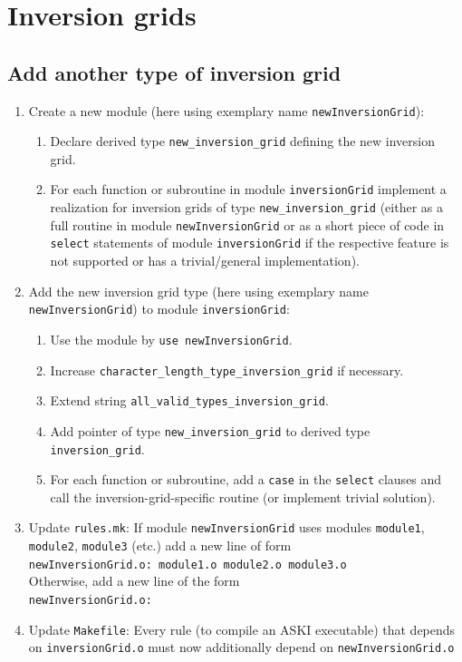 \documentclass[12pt,a4paper]{article}
\newcommand{\lcode}[1]{\nolinkurl{#1}}
\newcommand{\ASKI}{ {\ttfamily ASKI} }
\begin{document}
\section{Inversion grids} \label{sec:inversion_grid}
\subsection{Add another type of inversion grid} \label{ssec-invgrid:new-type}
\begin{enumerate}
\item Create a new module (here using exemplary name \lcode{newInversionGrid}):
  \begin{enumerate}
  \item Declare derived type \lcode{new_inversion_grid} defining the new inversion grid.
  \item For each function or subroutine in module \lcode{inversionGrid} implement a realization for
    inversion grids of type \lcode{new_inversion_grid} (either as a full routine in module \lcode{newInversionGrid}
    or as a short piece of code in \lcode{select} statements of module \lcode{inversionGrid} if the respective feature is not
    supported or has a trivial/general implementation).
  \end{enumerate}
\item Add the new inversion grid type (here using exemplary name \lcode{newInversionGrid}) to module
  \lcode{inversionGrid}:
  \begin{enumerate}
  \item Use the module by \lcode{use newInversionGrid}.
  \item Increase \lcode{character_length_type_inversion_grid} if necessary.
  \item Extend string \lcode{all_valid_types_inversion_grid}.
  \item Add pointer of type \lcode{new_inversion_grid} to derived type \lcode{inversion_grid}.
  \item For each function or subroutine, add a \lcode{case} in the \lcode{select} clauses and call the 
    inversion-grid-specific routine (or implement trivial solution).
  \end{enumerate}
\item Update \lcode{rules.mk}:
  If module \lcode{newInversionGrid} uses modules \lcode{module1}, \lcode{module2}, \lcode{module3} (etc.)
  add a new line of form \\
  \lcode{newInversionGrid.o: module1.o module2.o module3.o}\\
  Otherwise, add a new line of the form\\
  \lcode{newInversionGrid.o:}
\item Update \lcode{Makefile}: Every rule (to compile an \ASKI{} executable) that depends on 
  \lcode{inversionGrid.o} must now additionally depend on \lcode{newInversionGrid.o}
\end{enumerate}
\end{document}
